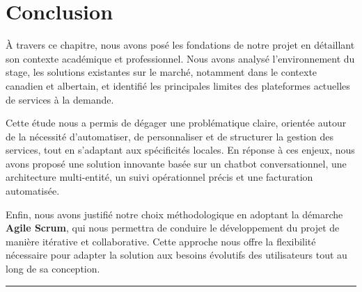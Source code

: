 \section*{Conclusion}

À travers ce chapitre, nous avons posé les fondations de notre projet en détaillant son contexte académique et professionnel. Nous avons analysé l’environnement du stage, les solutions existantes sur le marché, notamment dans le contexte canadien et albertain, et identifié les principales limites des plateformes actuelles de services à la demande.

Cette étude nous a permis de dégager une problématique claire, orientée autour de la nécessité d’automatiser, de personnaliser et de structurer la gestion des services, tout en s’adaptant aux spécificités locales. En réponse à ces enjeux, nous avons proposé une solution innovante basée sur un chatbot conversationnel, une architecture multi-entité, un suivi opérationnel précis et une facturation automatisée.

Enfin, nous avons justifié notre choix méthodologique en adoptant la démarche \textbf{Agile Scrum}, qui nous permettra de conduire le développement du projet de manière itérative et collaborative. Cette approche nous offre la flexibilité nécessaire pour adapter la solution aux besoins évolutifs des utilisateurs tout au long de sa conception.


\rule[1em]{32em}{0.5pt}
